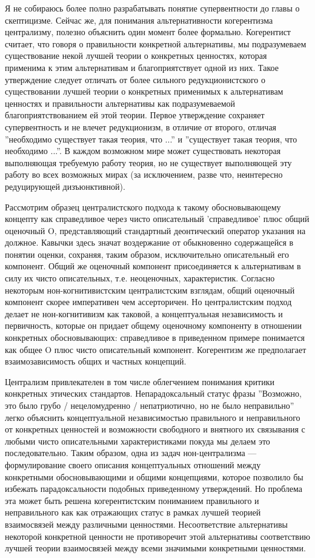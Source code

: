 \documentclass[11pt]{book}
\begin{document}
Я не собираюсь более полно разрабатывать понятие супервентности до главы о скептицизме. Сейчас же, для понимания альтернативности когерентизма централизму, полезно объяснить один момент более формально. Когерентист считает, что говоря о правильности конкретной альтернативы, мы подразумеваем существование некой лучшей теории о конкретных ценностях, которая применима к этим альтернативам и благоприятствует одной из них. Такое утверждение следует отличать от более сильного редукционистского о существовании лучшей теории о конкретных применимых к альтернативам ценностях и правильности альтернативы как подразумеваемой благоприятствованием ей этой теории. Первое утверждение сохраняет супервентность и не влечет редукционизм, в отличие от второго, отличая ''необходимо существует такая теория, что ...'' и ''существует такая теория, что необходимо ...''. В каждом возможном мире может существовать некоторая выполняющая требуемую работу теория, но не существует выполняющей эту работу во всех возможных мирах (за исключением, разве что, неинтересно редуцирующей дизъюнктивной).

Рассмотрим образец централистского подхода к такому обосновывающему концепту как справедливое через чисто описательный 'справедливое' плюс общий оценочный O, представляющий стандартный деонтический оператор указания на должное. Кавычки здесь значат воздержание от обыкновенно содержащейся в понятии оценки, сохраняя, таким образом, исключительно описательный его компонент. Общий же оценочный компонент присоединяется к альтернативам в силу их чисто описательных, т.е. неоценочных, характеристик. Согласно некоторым нон-когнитивистским централистским взглядам, общий оценочный компонент скорее императивен чем ассерторичен. Но централистским подход делает не нон-когнитивизм как таковой, а концептуальная независимость и первичность, которые он придает общему оценочному компоненту в отношении конкретных обосновывающих: справедливое в приведенном примере понимается как общее O плюс чисто описательный компонент. Когерентизм же предполагает взаимозависимость общих и частных концепций.

Централизм привлекателен в том числе облегчением понимания критики конкретных этических стандартов. Непарадоксальный статус фразы ''Возможно, это было грубо / нецеломудренно / непатриотично, но не было неправильно'' легко объяснить концептуальной независимостью правильного и неправильного от конкретных ценностей и возможности свободного и внятного их связывания с любыми чисто описательными характеристиками покуда мы делаем это последовательно. Таким образом, одна из задач нон-централизма --- формулирование своего описания концептуальных отношений между конкретными обосновывающими и общими концепциями, которое позволило бы избежать парадоксальности подобных приведенному утверждений. Но проблема эта может быть решена когерентистским пониманием правильного и неправильного как как отражающих статус в рамках лучшей теорией взаимосвязей между различными ценностями. Несоответствие альтернативы некоторой конкретной ценности не противоречит этой альтернативы соответствию лучшей теории взаимосвязей между всеми значимыми конкретными ценностями.
\end{document}
